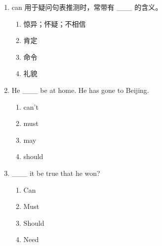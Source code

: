 \documentclass[11pt,a4paper]{ctexart}
\begin{document}
\begin{enumerate}[leftmargin=*,itemsep=4pt]
\begin{enumerate}[label=\Alph*.,leftmargin=2em,itemsep=1pt,topsep=2pt]
\end{enumerate}
\item can 用于疑问句表推测时，常带有 \_\_\_ 的含义。
\begin{enumerate}[label=\Alph*.,leftmargin=2em,itemsep=1pt,topsep=2pt]
\item 惊异；怀疑；不相信
\item 肯定
\item 命令
\item 礼貌
\end{enumerate}
\item He \_\_\_ be at home. He has gone to Beijing.
\begin{enumerate}[label=\Alph*.,leftmargin=2em,itemsep=1pt,topsep=2pt]
\item can’t
\item must
\item may
\item should
\end{enumerate}
\item \_\_\_ it be true that he won?
\begin{enumerate}[label=\Alph*.,leftmargin=2em,itemsep=1pt,topsep=2pt]
\item Can
\item Must
\item Should
\item Need
\end{enumerate}
\end{enumerate}
\end{document}
